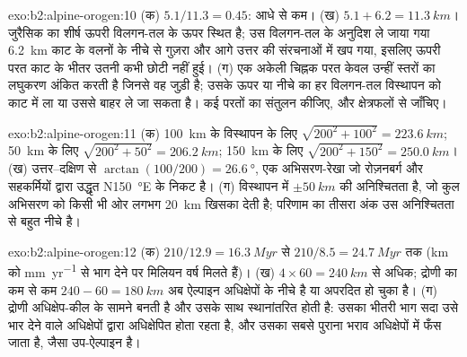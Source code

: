 \begin{solution}{exo:b2:alpine-orogen:10}
(क) $5.1/11.3 = 0.45$: आधे से कम। (ख) $5.1 + 6.2 = \qty{11.3}{km}$। जुरैसिक का शीर्ष
ऊपरी विलगन-तल के ऊपर स्थित है; उस विलगन-तल के अनुदिश ले जाया गया \qty{6.2}{km}
काट के वलनों के नीचे से गुज़रा और आगे उत्तर की संरचनाओं में खप गया, इसलिए
ऊपरी परत काट के भीतर उतनी कभी छोटी नहीं हुई। (ग) एक अकेली चिह्नक परत केवल उन्हीं
स्तरों का लघुकरण अंकित करती है जिनसे वह जुड़ी है; उसके ऊपर या नीचे का हर विलगन-तल विस्थापन को काट में
ला या उससे बाहर ले जा सकता है। कई परतों का संतुलन कीजिए, और क्षेत्रफलों से जाँचिए।
\end{solution}

\begin{solution}{exo:b2:alpine-orogen:11}
(क) \qty{100}{km} के विस्थापन के लिए $\sqrt{200^2 + 100^2} = \qty{223.6}{km}$;
\qty{50}{km} के लिए $\sqrt{200^2 + 50^2} = \qty{206.2}{km}$; \qty{150}{km} के लिए
$\sqrt{200^2 + 150^2} = \qty{250.0}{km}$। (ख) उत्तर--दक्षिण से $\arctan(100/200) = \qty{26.6}{\degree}$,
एक अभिसरण-रेखा जो रोज़नबर्ग और सहकर्मियों द्वारा उद्धृत N\qty{150}{\degree}E
के निकट है। (ग) विस्थापन में $\pm\qty{50}{km}$ की अनिश्चितता है, जो कुल
अभिसरण को किसी भी ओर लगभग \qty{20}{km} खिसका देती है; परिणाम का तीसरा अंक
उस अनिश्चितता से बहुत नीचे है।
\end{solution}

\begin{solution}{exo:b2:alpine-orogen:12}
(क) $210/12.9 = \qty{16.3}{Myr}$ से $210/8.5 = \qty{24.7}{Myr}$ तक (\unit{km} को
\unit{mm.yr^{-1}} से भाग देने पर मिलियन वर्ष मिलते हैं)। (ख) $4\times60 = \qty{240}{km}$ से अधिक;
द्रोणी का कम से कम $240 - 60 = \qty{180}{km}$ अब ऐल्पाइन अधिक्षेपों के नीचे है या अपरदित हो
चुका है। (ग) द्रोणी अधिक्षेप-कील के सामने बनती है और उसके साथ स्थानांतरित होती है: उसका भीतरी
भाग सदा उसे भार देने वाले अधिक्षेपों द्वारा अधिक्षेपित होता रहता है, और उसका सबसे पुराना भराव
अधिक्षेपों में फँस जाता है, जैसा उप-ऐल्पाइन  है।
\end{solution}

